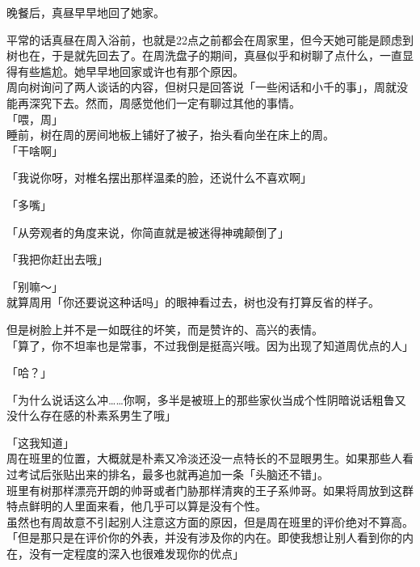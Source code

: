 \vspace{2\baselineskip}

晚餐后，真昼早早地回了她家。

平常的话真昼在周入浴前，也就是22点之前都会在周家里，但今天她可能是顾虑到树也在，于是就先回去了。在周洗盘子的期间，真昼似乎和树聊了点什么，一直显得有些尴尬。她早早地回家或许也有那个原因。\\

周向树询问了两人谈话的内容，但树只是回答说「一些闲话和小千的事」，周就没能再深究下去。然而，周感觉他们一定有聊过其他的事情。\\

「喂，周」\\

睡前，树在周的房间地板上铺好了被子，抬头看向坐在床上的周。\\

「干啥啊」

「我说你呀，对椎名摆出那样温柔的脸，还说什么不喜欢啊」

「多嘴」

「从旁观者的角度来说，你简直就是被迷得神魂颠倒了」

「我把你赶出去哦」

「别嘛～」\\

就算周用「你还要说这种话吗」的眼神看过去，树也没有打算反省的样子。

但是树脸上并不是一如既往的坏笑，而是赞许的、高兴的表情。\\

「算了，你不坦率也是常事，不过我倒是挺高兴哦。因为出现了知道周优点的人」

「哈？」

「为什么说话这么冲……你啊，多半是被班上的那些家伙当成个性阴暗说话粗鲁又没什么存在感的朴素系男生了哦」

「这我知道」\\

周在班里的位置，大概就是朴素又冷淡还没一点特长的不显眼男生。如果那些人看过考试后张贴出来的排名，最多也就再追加一条「头脑还不错」。\\

班里有树那样漂亮开朗的帅哥或者门胁那样清爽的王子系帅哥。如果将周放到这群特点鲜明的人里面来看，他几乎可以算是没有个性。\\

虽然也有周故意不引起别人注意这方面的原因，但是周在班里的评价绝对不算高。\\

「但是那只是在评价你的外表，并没有涉及你的内在。即使我想让别人看到你的内在，没有一定程度的深入也很难发现你的优点」\\


